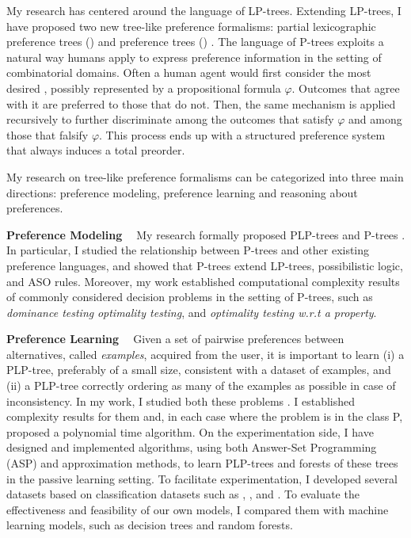 My research has centered around the language of LP-trees.
Extending LP-trees, I have proposed two new tree-like preference formalisms:
partial lexicographic preference trees () \cite{conf/aaai15/LiuT}
and preference trees () \cite{fraser1994,liu2014preference,conf/adt15/liuT}.
The language of P-trees exploits a natural way humans apply to
express preference information in the setting of combinatorial domains.
Often a human agent would first consider the most desired ,
possibly represented by a propositional formula $\varphi$.
Outcomes that agree with it are preferred to those that do not.  
Then, the same mechanism is applied recursively to further discriminate 
among the outcomes that satisfy $\varphi$ and among those that falsify $\varphi$.
This process ends up with a structured preference system that always
induces a total preorder.

My research on tree-like preference formalisms can be categorized into
three main directions: preference modeling, preference learning and 
reasoning about preferences.

\smallskip \noindent \textbf{Preference Modeling \ }
\noindent My research formally proposed 
PLP-trees \cite{conf/aaai15/LiuT} and P-trees \cite{liu2014preference,conf/adt15/liuT}.
In particular, I studied
the relationship between P-trees and other existing preference languages, and
showed that P-trees extend
LP-trees, possibilistic logic, and ASO rules.
Moreover, my work established computational complexity results of commonly considered decision
problems in the setting of P-trees, such as \textit{dominance testing} 
\textit{optimality testing}, and
\textit{optimality testing w.r.t a property}.

\smallskip \noindent \textbf{Preference Learning \ }
Given a set of pairwise preferences between alternatives, 
called \textit{examples}, acquired from the user,
it is important to learn (i) a PLP-tree, 
preferably of a small size, 
consistent with a dataset of examples, and (ii) a PLP-tree correctly
ordering as many of the examples as possible in case
of inconsistency. In my work, I studied both these problems \cite{conf/aaai15/LiuT}. 
I established complexity results
for them and, in each case where the problem
is in the class P, proposed a polynomial time algorithm.
On the experimentation side,
I have designed and implemented algorithms, using both
Answer-Set Programming (ASP) and approximation methods, to learn PLP-trees 
and forests of these trees in the passive learning setting.
To facilitate experimentation, I developed several datasets
based on classification datasets such as ,
, and .
To evaluate the effectiveness and feasibility of our own models, I 
compared them with machine learning models, such as 
decision trees and random forests.

